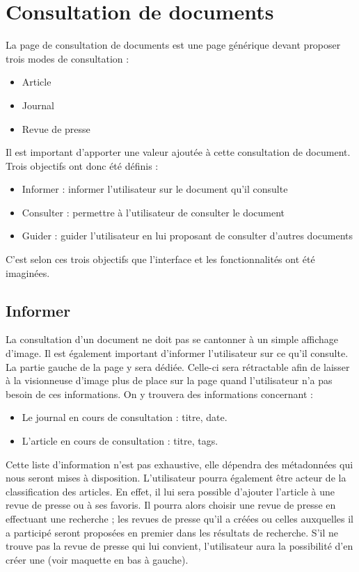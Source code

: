 \section{Consultation de documents}
\label{sec:consultation}

La page de consultation de documents est une page générique devant proposer trois modes de consultation :
\begin{itemize}
\item Article
\item Journal
\item Revue de presse
\end{itemize}

Il est important d’apporter une valeur ajoutée à cette consultation de document. Trois objectifs ont donc été définis :
\begin{itemize}
\item Informer : informer l’utilisateur sur le document qu’il consulte
\item Consulter : permettre à l’utilisateur de consulter le document
\item Guider : guider l’utilisateur en lui proposant de consulter d’autres documents
\end{itemize}
C’est selon ces trois objectifs que l’interface et les fonctionnalités ont été imaginées.


\subsection{Informer}
\label{sec:consultation_informer}
	La consultation d’un document ne doit pas se cantonner à un simple affichage d’image. Il est également important d’informer l’utilisateur sur ce qu’il consulte. La partie gauche de la page y sera dédiée. Celle-ci sera rétractable afin de laisser à la visionneuse d'image plus de place sur la page quand l'utilisateur n'a pas besoin de ces informations.
On y trouvera des informations concernant :
\begin{itemize}
\item Le journal en cours de consultation : titre, date.
\item L’article en cours de consultation : titre, tags.
\end{itemize}
	Cette liste d’information n’est pas exhaustive, elle dépendra des métadonnées qui nous seront mises à disposition.
	L’utilisateur pourra également être acteur de la classification des articles. En effet, il lui sera possible d’ajouter l’article à une revue de presse ou à ses favoris. Il pourra alors choisir une revue de presse en effectuant une recherche ; les revues de presse qu’il a créées ou celles auxquelles il a participé seront proposées en premier dans les résultats de recherche. S’il ne trouve pas la revue de presse qui lui convient, l’utilisateur aura la possibilité d’en créer une (voir maquette en bas à gauche).

